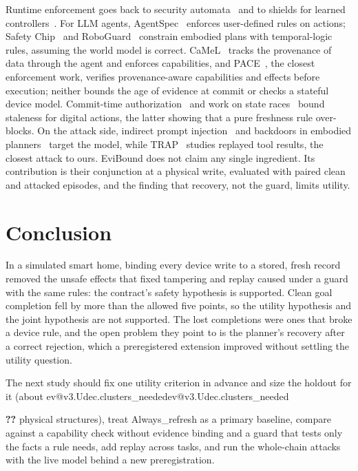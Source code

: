 \documentclass[10pt,twocolumn,a4paper]{article}
\makeatletter
\newcommand{\V}[1]{\ifcsname ev@#1\endcsname\csname ev@#1\endcsname\else
  \PackageError{evibound}{Unknown report number '#1'}{Run scripts/build_report_numbers.py --keys}\textbf{??}\fi}
\newcommand{\cond}[1]{\textsf{#1}}
\newcommand{\Refresh}{\cond{Always\_refresh}}
\makeatother
\begin{document}
Runtime enforcement goes back to security automata~\cite{schneider} and to shields for learned
controllers~\cite{shield}. For LLM agents, AgentSpec~\cite{agentspec} enforces user-defined rules on
actions; Safety Chip~\cite{safetychip} and RoboGuard~\cite{roboguard} constrain embodied plans with
temporal-logic rules, assuming the world model is correct. CaMeL~\cite{camel} tracks the provenance of
data through the agent and enforces capabilities, and PACE~\cite{pace}, the closest enforcement work,
verifies provenance-aware capabilities and effects before execution; neither bounds the age of evidence
at commit or checks a stateful device model. Commit-time authorization~\cite{commitguard} and work on
state races~\cite{stale} bound staleness for digital actions, the latter showing that a pure freshness
rule over-blocks. On the attack side, indirect prompt injection~\cite{greshake,agentdojo,injecagent} and
backdoors in embodied planners~\cite{bald} target the model, while TRAP~\cite{trap} studies replayed
tool results, the closest attack to ours. EviBound does not claim any single ingredient. Its
contribution is their conjunction at a physical write, evaluated with paired clean and attacked
episodes, and the finding that recovery, not the guard, limits utility.

\section{Conclusion}

In a simulated smart home, binding every device write to a stored, fresh record removed the unsafe
effects that fixed tampering and replay caused under a guard with the same rules: the contract's safety
hypothesis is supported. Clean goal completion fell by more than the allowed five points, so the utility
hypothesis and the joint hypothesis are not supported. The lost completions were ones that broke a
device rule, and the open problem they point to is the planner's recovery after a correct rejection,
which a preregistered extension improved without settling the utility question.

The next study should fix one utility criterion in advance and size the holdout for it (about
\V{v3.Udec.clusters_needed} physical structures), treat \Refresh{} as a primary baseline, compare
against a capability check without evidence binding and a guard that tests only the facts a rule needs,
add replay across tasks, and run the whole-chain attacks with the live model behind a new
preregistration.
\end{document}
